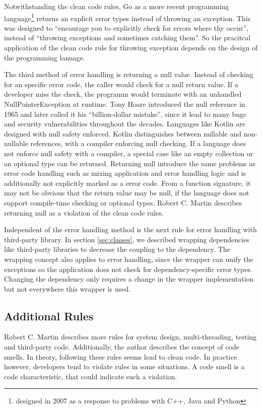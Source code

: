 Notwithstanding the clean code rules, Go as a more recent programming language\footnote{designed in 2007 as a response to problems with C++, Java and Python\cite{noauthor_go_nodate}} returns an explicit error types instead of throwing an exception. This was designed to \enquote{encourage you to explicitly check for errors where thy occur}, instead of \enquote{throwing exceptions and sometimes catching them}\cite{gerrand_error_2011}.   
So the pracitcal application of the clean code rule for throwing exception depends on the design of the programming lanuage.

The third method of error handling is returning a null value. Instead of checking for an specific error code, the caller would check for a null return value. If a developer miss the check, the programm would terminate with an unhandled NullPointerException at runtime. Tony Hoare introduced the null reference in 1965 and later called it his \enquote{billion-dollar mistake}\cite{hoare_null_2009}, since it lead to many bugs and security vulnerabilities throughout the decades. Languages like Kotlin are designed with null safety enforced. Kotlin distinguishes between nullable and non-nullable references, with a compiler enforcing null checking\cite{noauthor_null_nodate}. If a language does not enforce null safety with a compiler, a special case like an empty collection or an optional type can be returned. 
Returning null introduce the same problems as error code handling such as mixing application and error handling logic and is additionally not explicitly marked as a error code. From a function signature, it may not be obvious that the return value may be null, if the language does not support compile-time checking or optional types. Robert C. Martin describes returning null as a violation of the clean code rules\cite{martin_clean_2009}. 

Independent of the error handling method is the next rule for error handling with third-party library. In section \ref{sec:classes}, we described wrapping dependencies like third-party libraries to decrease the coupling to the dependency. The wrapping concept also applies to error handling, since the wrapper can unify the exceptions so the application does not check for dependency-specific error types. Changing the dependency only requires a change in the wrapper implementation but not everywhere this wrapper is used. 

\subsection{Additional Rules}
Robert C. Martin describes more rules for system design, multi-threading, testing and third-party code\cite{martin_clean_2009}. 
Additionally, the author describes the concept of code smells. In theory, following these rules seems lead to clean code. In practice however, developers tend to violate rules in some situations. A code smell is a code characteristic, that could indicate such a violation.


